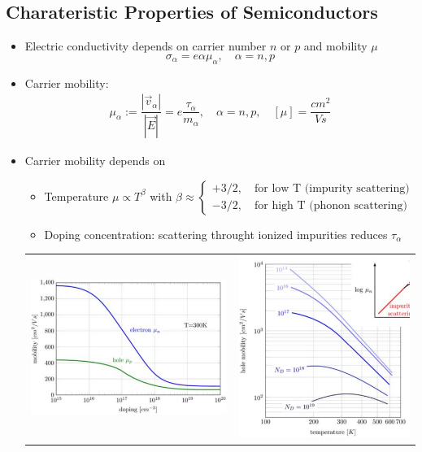 \subsection{Charateristic Properties of Semiconductors}
\begin{itemize}
  \item Electric conductivity depends on carrier number $n$ or $p$ and mobility $\mu$
        \begin{equation*}
          \sigma_{\alpha} = e\alpha \mu_{\alpha}, \quad \alpha = n, p
        \end{equation*}
  \item Carrier mobility:
        \begin{align*}
          \mu_{\alpha} := \dfrac{|\vec{v}_{\alpha}|}{|\vec{E}|} = e \dfrac{\tau_{\alpha}}{m_{\alpha}}, \quad \alpha = n, p, \quad [\mu] = \dfrac{\si{cm^{2}}}{\si{Vs}}
        \end{align*}
  \item Carrier mobility depends on
        \begin{itemize}
                \item Temperature $\mu \propto T^{\beta}$ with $\beta \approx \begin{cases}+3/2, \quad \text{for low T (impurity scattering)}\\ -3/2, \quad \text{for high T (phonon scattering)} \end{cases}$
                \item Doping concentration: scattering throught ionized impurities reduces $\tau_{\alpha}$
        \end{itemize}
        \begin{tabular}{cc}
          \includegraphics[width=.25\textwidth]{content/bdml/pictures/electron_vs_hole_mobility}
          &
          \includegraphics[width=.22\textwidth]{content/bdml/pictures/hole_mobility_doping}
        \end{tabular}

\end{itemize}
